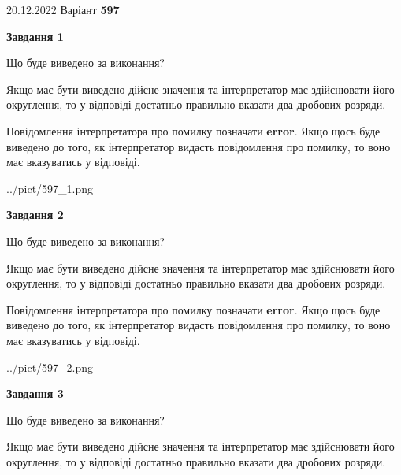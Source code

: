 \documentclass[12pt, ukrainian]{article}
\begin{document}
{20.12.2022 Варіант \No \textbf { 597 }\par}
{
\begin {Large}

{\begin {center}\textbf{Завдання 1}\end {center}}\par
Що буде виведено за виконання? \par

Якщо має бути виведено дійсне значення та інтерпретатор має здійснювати його округлення, 
то у відповіді достатньо правильно вказати два дробових розряди.

Повідомлення інтерпретатора про помилку позначати \textbf{error}.
Якщо щось буде виведено до того, як інтерпретатор видасть повідомлення про помилку, 
то воно має вказуватись у відповіді. \par

\begin{center}
	{../pict/597_1.png}
\end{center}
\newpage

{\begin {center}\textbf{Завдання 2}\end {center}}\par
Що буде виведено за виконання? \par

Якщо має бути виведено дійсне значення та інтерпретатор має здійснювати його округлення, 
то у відповіді достатньо правильно вказати два дробових розряди.

Повідомлення інтерпретатора про помилку позначати \textbf{error}.
Якщо щось буде виведено до того, як інтерпретатор видасть повідомлення про помилку, 
то воно має вказуватись у відповіді. \par

\begin{center}
	{../pict/597_2.png}
\end{center}
\newpage

{\begin {center}\textbf{Завдання 3}\end {center}}\par
Що буде виведено за виконання? \par

Якщо має бути виведено дійсне значення та інтерпретатор має здійснювати його округлення, 
то у відповіді достатньо правильно вказати два дробових розряди.


\end{Large}}
\end{document}
